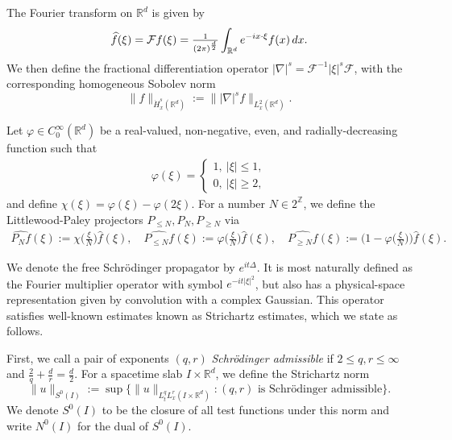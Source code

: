 \documentclass[reqno,11pt]{amsart}
\theoremstyle{plain}
\theoremstyle{definition}
\numberwithin{equation}{section}
\numberwithin{theorem}{section}
\def\ge{\geqslant}
\def\geq{\geqslant}
\def\leq{\leqslant}
\def\R{\mathbb{R}}
\begin{document}
The Fourier transform on $\mathbb{R}^d$ is given by
\begin{equation*}
\aligned \widehat{f}(\xi)= \mathcal{F} f(\xi)= \tfrac{1}{(2\pi)^{\frac{d}{2}}}\int_{\mathbb{R}^d}e^{- ix\cdot \xi}f(x)\,dx.
\endaligned
\end{equation*}
We then define the fractional differentiation operator $|\nabla|^s=\mathcal{F}^{-1}|\xi|^s\mathcal{F}$, with the corresponding homogeneous Sobolev norm 
\[
\|f\|_{\dot{H}_x^s(\R^d)}:=\||\nabla|^s f\|_{L_x^2(\R^d)}.
\]

Let $\varphi\in C_0^\infty(\R^d)$ be a real-valued, non-negative, even, and radially-decreasing function such that
\begin{align*}
\varphi(\xi) =
\begin{cases}
1, \ |\xi| \leq 1, \\
0, \  |\xi| \ge 2,
\end{cases}
\end{align*}
and define $\chi(\xi)=\varphi(\xi)-\varphi(2\xi)$. For a  number $N\in 2^{\mathbb{Z}}$, we define the Littlewood-Paley projectors $P_{\leq N}, P_{N}, P_{\geq N}$ via
\begin{align*}
\widehat{P_Nf}(\xi):=\chi\big(\tfrac{\xi}{N} \big)\widehat{f}(\xi),  \quad \widehat{P_{\leq N}f}(\xi):=\varphi\big(\tfrac{\xi}{N} \big)\widehat{f}(\xi),\quad \widehat{P_{\geq N}f}(\xi):=\Big(1-\varphi\big(\tfrac{\xi}{N} \big)\Big)\widehat{f}(\xi).
\end{align*}

We denote the free Schr\"odinger propagator by $e^{it\Delta}$.  It is most naturally defined as the Fourier multiplier operator with symbol $e^{-it|\xi|^2}$, but also has a physical-space representation given by convolution with a complex Gaussian. This operator satisfies well-known estimates known as Strichartz estimates, which we state as follows.

First, we call a pair of exponents $(q,r)$ \emph{Schr\"odinger admissible}  if $2\leq q,r\leq\infty$ and $\tfrac{2}{q}+\tfrac{d}{r}=\frac{d}{2}.$ For a spacetime slab $I\times\R^d$, we define the Strichartz norm 
\[
\|u\|_{S^0(I)}:=\sup\big\{\|u\|_{L_t^{q}L_x^r(I\times\R^d)}:(q,r)\text{ is Schr\"odinger admissible}\big\}.
\]
We denote $S^0(I)$ to be the closure of all test functions under this norm and write $N^0(I)$ for the dual of
$S^0(I)$. 
\end{document}
